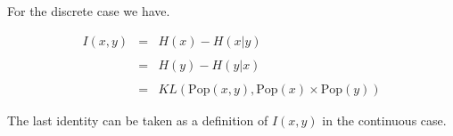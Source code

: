 {
\vfill
For the discrete case we have.

\vfill
\begin{eqnarray*}
  I(x,y) & = & H(x) - H(x|y) \\
  \\
  & = & H(y) - H(y|x) \\
  \\
  & = & KL(\mathrm{Pop}(x,y),\mathrm{Pop}(x)\times\mathrm{Pop}(y))
\end{eqnarray*}

The last identity can be taken as a definition of $I(x,y)$ in the continuous case.


}

